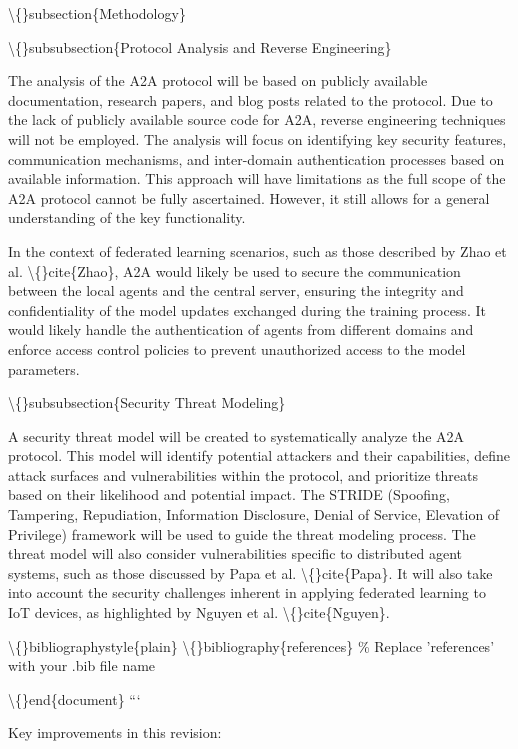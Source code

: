 \documentclass{article}
\begin{document}
\textbackslash\{\}subsection\{Methodology\}

\textbackslash\{\}subsubsection\{Protocol Analysis and Reverse Engineering\}

The analysis of the A2A protocol will be based on publicly available documentation, research papers, and blog posts related to the protocol. Due to the lack of publicly available source code for A2A, reverse engineering techniques will not be employed. The analysis will focus on identifying key security features, communication mechanisms, and inter-domain authentication processes based on available information. This approach will have limitations as the full scope of the A2A protocol cannot be fully ascertained. However, it still allows for a general understanding of the key functionality.

In the context of federated learning scenarios, such as those described by Zhao et al. \textbackslash\{\}cite\{Zhao\}, A2A would likely be used to secure the communication between the local agents and the central server, ensuring the integrity and confidentiality of the model updates exchanged during the training process. It would likely handle the authentication of agents from different domains and enforce access control policies to prevent unauthorized access to the model parameters.

\textbackslash\{\}subsubsection\{Security Threat Modeling\}

A security threat model will be created to systematically analyze the A2A protocol. This model will identify potential attackers and their capabilities, define attack surfaces and vulnerabilities within the protocol, and prioritize threats based on their likelihood and potential impact. The STRIDE (Spoofing, Tampering, Repudiation, Information Disclosure, Denial of Service, Elevation of Privilege) framework will be used to guide the threat modeling process. The threat model will also consider vulnerabilities specific to distributed agent systems, such as those discussed by Papa et al. \textbackslash\{\}cite\{Papa\}. It will also take into account the security challenges inherent in applying federated learning to IoT devices, as highlighted by Nguyen et al. \textbackslash\{\}cite\{Nguyen\}.

\textbackslash\{\}bibliographystyle\{plain\}
\textbackslash\{\}bibliography\{references\} \% Replace 'references' with your .bib file name

\textbackslash\{\}end\{document\}
```

Key improvements in this revision:
\end{document}

